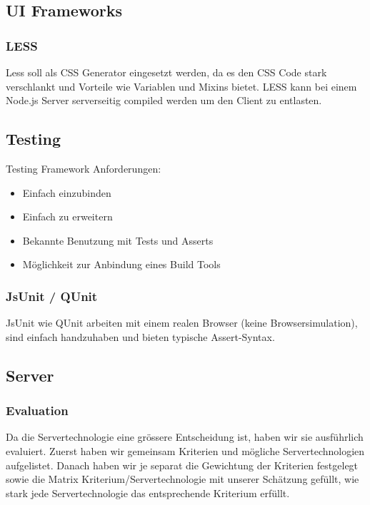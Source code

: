 		\subsection{UI Frameworks}
			\subsubsection{LESS}
				Less soll als CSS Generator eingesetzt werden, da es den CSS Code stark verschlankt und Vorteile wie Variablen und Mixins bietet. LESS kann bei einem Node.js Server serverseitig compiled werden um den Client zu entlasten.
				
		\subsection{Testing}
			Testing Framework Anforderungen:
			\begin{itemize}
				\item Einfach einzubinden
				\item Einfach zu erweitern
				\item Bekannte Benutzung mit Tests und Asserts
				\item Möglichkeit zur Anbindung eines Build Tools
			\end{itemize}

			\subsubsection{JsUnit / QUnit}
				JsUnit wie QUnit arbeiten mit einem realen Browser (keine Browsersimulation), 
				sind einfach handzuhaben und bieten typische Assert-Syntax.
				
				
	\subsection{Server}

		\subsubsection{Evaluation}\label{serverEvaluation}
			Da die Servertechnologie eine grössere Entscheidung ist, haben wir sie ausführlich evaluiert.
			Zuerst haben wir gemeinsam Kriterien und mögliche Servertechnologien aufgelistet.
			Danach haben wir je separat die Gewichtung der Kriterien festgelegt sowie die Matrix Kriterium/Servertechnologie mit unserer Schätzung gefüllt, wie stark jede Servertechnologie das entsprechende Kriterium erfüllt.
		
